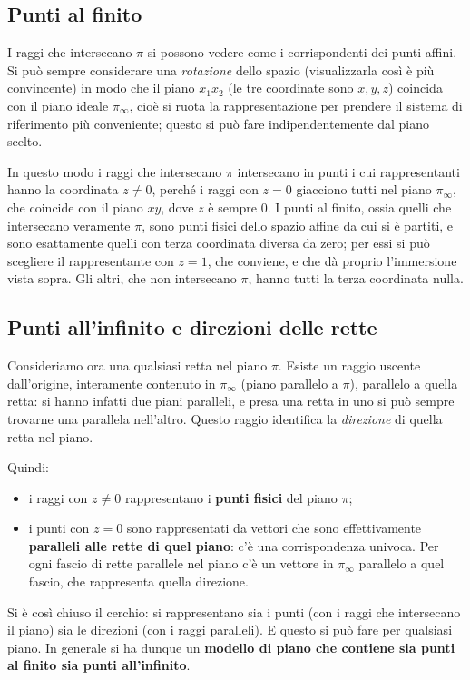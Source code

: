 \subsection{Punti al finito}

I raggi che intersecano $\pi$ si possono vedere come i corrispondenti dei punti affini. Si può sempre considerare una \emph{rotazione} dello spazio (visualizzarla così è più convincente) in modo che il piano $x_1x_2$ (le tre coordinate sono $x,y,z$) coincida con il piano ideale $\pi_\infty$, cioè si ruota la rappresentazione per prendere il sistema di riferimento più conveniente; questo si può fare indipendentemente dal piano scelto.

In questo modo i raggi che intersecano $\pi$ intersecano in punti i cui rappresentanti hanno la coordinata $z\neq 0$, perché i raggi con $z=0$ giacciono tutti nel piano $\pi_\infty$, che coincide con il piano $xy$, dove $z$ è sempre $0$. I punti al finito, ossia quelli che intersecano veramente $\pi$, sono punti fisici dello spazio affine da cui si è partiti, e sono esattamente quelli con terza coordinata diversa da zero; per essi si può scegliere il rappresentante con $z=1$, che conviene, e che dà proprio l'immersione vista sopra. Gli altri, che non intersecano $\pi$, hanno tutti la terza coordinata nulla.

\subsection{Punti all'infinito e direzioni delle rette}

Consideriamo ora una qualsiasi retta nel piano $\pi$. Esiste un raggio uscente dall'origine, interamente contenuto in $\pi_\infty$ (piano parallelo a $\pi$), parallelo a quella retta: si hanno infatti due piani paralleli, e presa una retta in uno si può sempre trovarne una parallela nell'altro. Questo raggio identifica la \emph{direzione} di quella retta nel piano.

Quindi:
\begin{itemize}
  \item i raggi con $z\neq 0$ rappresentano i \textbf{punti fisici} del piano $\pi$;
  \item i punti con $z=0$ sono rappresentati da vettori che sono effettivamente \textbf{paralleli alle rette di quel piano}: c'è una corrispondenza univoca. Per ogni fascio di rette parallele nel piano c'è un vettore in $\pi_\infty$ parallelo a quel fascio, che rappresenta quella direzione.
\end{itemize}

Si è così chiuso il cerchio: si rappresentano sia i punti (con i raggi che intersecano il piano) sia le direzioni (con i raggi paralleli). E questo si può fare per qualsiasi piano. In generale si ha dunque un \textbf{modello di piano che contiene sia punti al finito sia punti all'infinito}.
